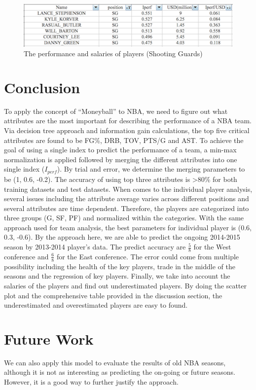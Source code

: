 \documentclass{acm_proc_article-sp}
\begin{document}
\begin{figure}[!htb]
\centering
\includegraphics{Fig-23.png}
\caption{The performance and salaries of players (Shooting Guards)}
\end{figure}

\vspace{50em}
\section{Conclusion}
\vspace{0.5em}
To apply the concept of ``Moneyball'' to NBA, we need to figure out what attributes are the most important for describing the performance of a NBA team. Via decision tree approach and information gain calculations, the top five critical attributes are found to be FG\%, DRB, TOV, PTS/G and AST. To achieve the goal of using a single index to predict the performance of a team, a min-max normalization is applied followed by merging the different attributes into one single index ($I_{perf}$). By trial and error, we determine the merging parameters to be (1, 0.6, -0.2). The accuracy of using top three attributes is >80\% for both training datasets and test datasets. When comes to the individual player analysis, several issues including the attribute average varies across different positions and several attributes are time dependent. Therefore, the players are categorized into three groups (G, SF, PF) and normalized within the categories. With the same approach used for team analysis, the best parameters for individual player is (0.6, 0.3, -0.6). By the approach here, we are able to predict the ongoing 2014-2015 season by 2013-2014 player's data. The predict accuracy are $\frac{5}{8}$ for the West conference and $\frac{6}{8}$ for the East conference. The error could come from multiple possibility including the health of the key players, trade in the middle of the seasons and the regression of key players. Finally, we take into account the salaries of the players and find out underestimated players. By doing the scatter plot and the comprehensive table provided in the discussion section, the underestimated and overestimated players are easy to found.

\vspace{2em}
\section{Future Work}
\vspace{0.5em}
We can also apply this model to evaluate the results of old NBA seasons, although it is not as interesting as predicting the on-going or future seasons. However, it is a good way to further justify the approach.
\end{document}
